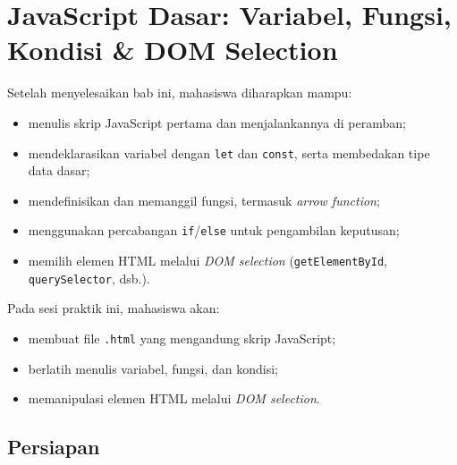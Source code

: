 
\chapter{JavaScript Dasar: Variabel, Fungsi, Kondisi \& DOM Selection}
\label{chap:mjs-10}

\begin{capaian}
Setelah menyelesaikan bab ini, mahasiswa diharapkan mampu:
\begin{itemize}
  \item menulis skrip JavaScript pertama dan menjalankannya di peramban;
  \item mendeklarasikan variabel dengan \texttt{let} dan \texttt{const}, serta membedakan tipe data dasar;
  \item mendefinisikan dan memanggil fungsi, termasuk \emph{arrow function};
  \item menggunakan percabangan \texttt{if}/\texttt{else} untuk pengambilan keputusan;
  \item memilih elemen HTML melalui \emph{DOM selection} (\texttt{getElementById}, \texttt{querySelector}, dsb.).
\end{itemize}
\end{capaian}

\begin{tujuanpraktik}
Pada sesi praktik ini, mahasiswa akan:
\begin{itemize}
  \item membuat file \texttt{.html} yang mengandung skrip JavaScript;
  \item berlatih menulis variabel, fungsi, dan kondisi;
  \item memanipulasi elemen HTML melalui \emph{DOM selection}.
\end{itemize}
\end{tujuanpraktik}

\section{Persiapan}
\label{sec:10-persiapan}

